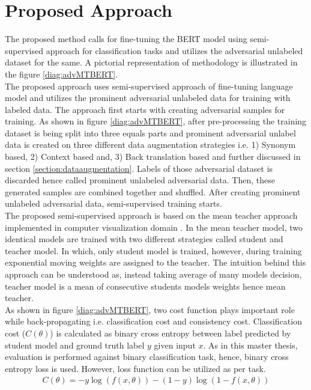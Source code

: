\documentclass[%
	BCOR=8mm, %
	DIV=12,
	toc=bibliography, %
	toc=listof, %
	oneside, %
	egregdoesnotlikesansseriftitles, %
	]{scrbook}
\begin{document}
\section{Proposed Approach}
The proposed method calls for fine-tuning the BERT model using semi-supervised approach for classification tasks and utilizes the adversarial unlabeled dataset for the same. A pictorial representation of methodology is illustrated in the figure \ref{diag:advMTBERT}.\\
The proposed approach uses semi-supervised approach of fine-tuning language model and utilizes the prominent adversarial unlabeled data for training with labeled data. The approach first starts with creating adversarial samples for training. As shown in figure \ref{diag:advMTBERT}, after pre-processing the training dataset is being split into three equals parts and prominent adversarial unlabel data is created on three different data augmentation strategies i.e. 1) Synonym based, 2) Context based and, 3) Back translation based and further discussed in section \ref{section:dataaugmentation}.  Labels of those adversarial dataset is discarded hence called prominent unlabeled adversarial data. Then, these generated samples are combined together and shuffled. After creating prominent unlabeled adversarial data, semi-supervised training starts.\\
The proposed semi-supervised approach is based on the mean teacher approach implemented in computer visualization domain \cite{tarvainen_mean_2018}. In the mean teacher model, two identical models are trained with two different strategies called student and teacher model. In which, only student model is trained, however, during training exponential moving weights are assigned to the teacher. The intuition behind this approach can be understood as, instead taking average of many models decision, teacher model is a mean of consecutive students models weights hence mean teacher. \\
As shown in figure \ref{diag:advMTBERT}, two cost function plays important role while back-propagating i.e. classification cost and consistency cost. Classification cost ($C(\theta)$) is calculated as binary cross entropy between label predicted by student model and ground truth label $y$ given input $x$.  As in this master thesis, evaluation is performed against binary classification task, hence, binary cross entropy loss is used. However, loss function can be utilized as per task.\\
\begin{equation}
    \begin{aligned}
        C( \theta )=-y \log (f(x,\theta))-(1-y) \log(1-f(x,\theta))
        \label{eq:classification_cost}
    \end{aligned}
\end{equation}
\end{document}
